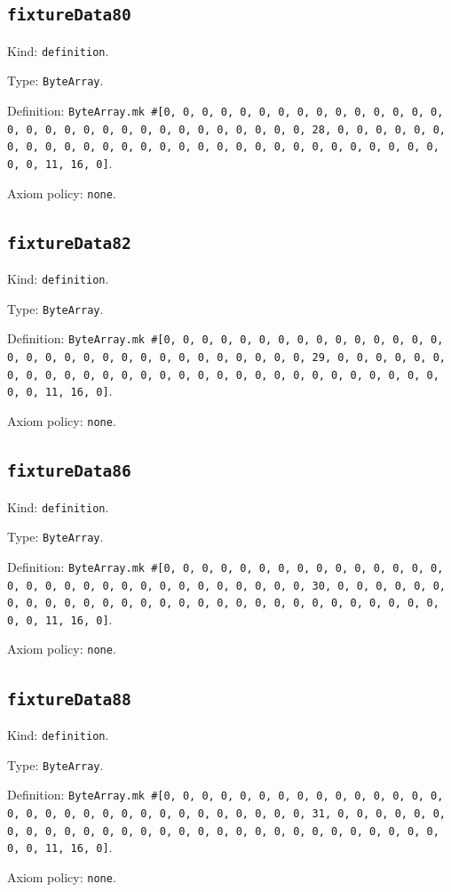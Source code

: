 \documentclass[11pt]{article}
\begin{document}
\subsection*{\texttt{fixtureData80}}
\noindent Kind: \texttt{definition}.\par
\noindent Type: \texttt{ByteArray}.\par
\noindent Definition: \texttt{ByteArray.mk \#[0, 0, 0, 0, 0, 0, 0, 0, 0, 0, 0, 0, 0, 0, 0, 0, 0, 0, 0, 0, 0, 0, 0, 0, 0, 0, 0, 0, 0, 0, 0, 28, 0, 0, 0, 0, 0, 0, 0, 0, 0, 0, 0, 0, 0, 0, 0, 0, 0, 0, 0, 0, 0, 0, 0, 0, 0, 0, 0, 0, 0, 0, 0, 11, 16, 0]}.\par
\noindent Axiom policy: \texttt{none}.\par
\subsection*{\texttt{fixtureData82}}
\noindent Kind: \texttt{definition}.\par
\noindent Type: \texttt{ByteArray}.\par
\noindent Definition: \texttt{ByteArray.mk \#[0, 0, 0, 0, 0, 0, 0, 0, 0, 0, 0, 0, 0, 0, 0, 0, 0, 0, 0, 0, 0, 0, 0, 0, 0, 0, 0, 0, 0, 0, 0, 29, 0, 0, 0, 0, 0, 0, 0, 0, 0, 0, 0, 0, 0, 0, 0, 0, 0, 0, 0, 0, 0, 0, 0, 0, 0, 0, 0, 0, 0, 0, 0, 11, 16, 0]}.\par
\noindent Axiom policy: \texttt{none}.\par
\subsection*{\texttt{fixtureData86}}
\noindent Kind: \texttt{definition}.\par
\noindent Type: \texttt{ByteArray}.\par
\noindent Definition: \texttt{ByteArray.mk \#[0, 0, 0, 0, 0, 0, 0, 0, 0, 0, 0, 0, 0, 0, 0, 0, 0, 0, 0, 0, 0, 0, 0, 0, 0, 0, 0, 0, 0, 0, 0, 30, 0, 0, 0, 0, 0, 0, 0, 0, 0, 0, 0, 0, 0, 0, 0, 0, 0, 0, 0, 0, 0, 0, 0, 0, 0, 0, 0, 0, 0, 0, 0, 11, 16, 0]}.\par
\noindent Axiom policy: \texttt{none}.\par
\subsection*{\texttt{fixtureData88}}
\noindent Kind: \texttt{definition}.\par
\noindent Type: \texttt{ByteArray}.\par
\noindent Definition: \texttt{ByteArray.mk \#[0, 0, 0, 0, 0, 0, 0, 0, 0, 0, 0, 0, 0, 0, 0, 0, 0, 0, 0, 0, 0, 0, 0, 0, 0, 0, 0, 0, 0, 0, 0, 31, 0, 0, 0, 0, 0, 0, 0, 0, 0, 0, 0, 0, 0, 0, 0, 0, 0, 0, 0, 0, 0, 0, 0, 0, 0, 0, 0, 0, 0, 0, 0, 11, 16, 0]}.\par
\noindent Axiom policy: \texttt{none}.\par
\end{document}
